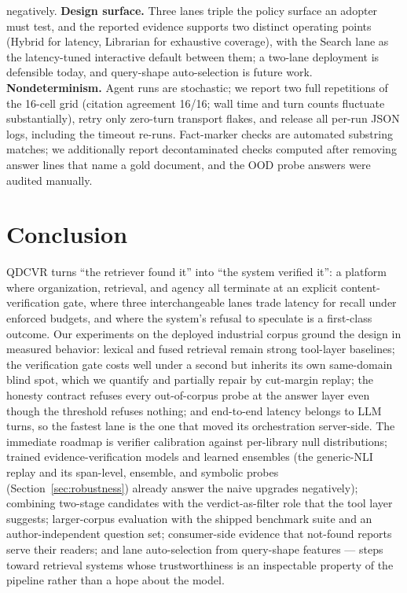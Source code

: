 \documentclass[preprint,12pt]{elsarticle}
\begin{document}
negatively.
\textbf{Design surface.} Three lanes triple the policy surface an adopter
must test, and the reported evidence supports two distinct operating
points (Hybrid for latency, Librarian for exhaustive coverage), with the
Search lane as the latency-tuned interactive default between them; a
two-lane deployment is defensible today, and query-shape auto-selection is
future work.
\textbf{Nondeterminism.} Agent runs are stochastic; we report two full
repetitions of the 16-cell grid (citation agreement 16/16; wall time and
turn counts fluctuate substantially), retry only zero-turn transport
flakes, and release all per-run JSON logs, including the timeout re-runs.
Fact-marker checks are automated substring matches; we additionally report
decontaminated checks computed after removing answer lines that name a
gold document, and the OOD probe answers were audited manually.

\section{Conclusion}
\label{sec:conclusion}

QDCVR turns ``the retriever found it'' into ``the system verified it'':
a platform where organization, retrieval, and agency all terminate at an
explicit content-verification gate, where three interchangeable lanes trade
latency for recall under enforced budgets, and where the system's refusal
to speculate is a first-class outcome. Our experiments on the deployed
industrial corpus ground the design in measured behavior: lexical and fused
retrieval remain strong tool-layer baselines; the verification gate costs
well under a second but inherits its own same-domain blind spot, which we
quantify and partially repair by cut-margin replay; the honesty contract
refuses every out-of-corpus probe at the answer layer even though the
threshold refuses nothing; and end-to-end latency belongs to LLM turns, so
the fastest lane is the one that moved its orchestration server-side. The immediate roadmap
is verifier calibration against per-library null distributions; trained
evidence-verification models and learned ensembles (the generic-NLI
replay and its span-level, ensemble, and symbolic probes
(Section~\ref{sec:robustness}) already answer the naive upgrades
negatively); combining two-stage
candidates with the verdict-as-filter role that the tool layer suggests;
larger-corpus evaluation with the shipped benchmark suite and an
author-independent question set; consumer-side evidence that
not-found reports serve their readers; and lane auto-selection from
query-shape features --- steps toward retrieval systems whose trustworthiness
is an inspectable property of the pipeline rather than a hope about the
model.
\end{document}

